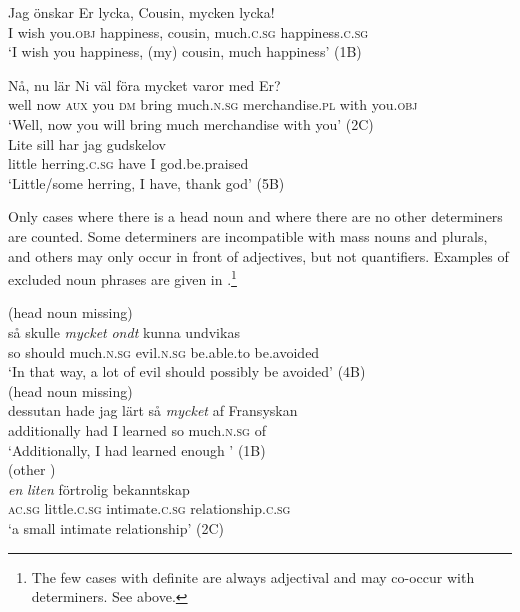 \documentclass[output=paper]{langscibook}
\begin{document}
\ea\label{ex:delsing:6}
\ea
\gll Jag  önskar    Er        lycka,      Cousin,  mycken      lycka! \\
I          wish     you.\textsc{obj}   happiness,  cousin,    much.\textsc{c}.\textsc{sg}  happiness.\textsc{c}.\textsc{sg}\\
\glt ‘I wish you happiness, (my) cousin, much happiness’ (1B)

\ex
\gll Nå,    nu    lär    Ni        väl    föra    mycket      varor med      Er? \\
    well    now    \textsc{aux}  you      \textsc{dm}     bring  much.\textsc{n.sg}  merchandise.\textsc{pl} with     you.\textsc{obj}\\
\glt ‘Well, now you will bring much merchandise with you’ (2C)\\

\ex
\gll Lite    sill            har    jag    gudskelov \\
    little    herring.\textsc{c}.\textsc{sg}   have   I       god.be.praised\\
    \glt ‘Little/some herring, I have, thank god’ (5B)\\
\z
\z



Only cases where there is a head noun and where there are no other determiners are counted. Some determiners are incompatible with mass nouns and plurals, and others may only occur in front of adjectives, but not quantifiers. Examples of excluded noun phrases are given in .\footnote{The few cases with definite  are always adjectival and may co-occur with determiners. See  above.}


\ea\label{ex:delsing:7}
\ea(head noun missing)\\
\gll så    skulle  \textit{mycket}         \textit{ondt}          kunna     undvikas     \\
so        should  much.\textsc{n.sg}   {evil.\textsc{n.sg}}  be.able.to be.avoided \\
    \glt ‘In that way, a lot of evil should possibly be avoided’ (4B)\\
\ex(head noun missing)\\
\gll dessutan    hade  jag  lärt      så    \textit{mycket} af    Fransyskan\\
     additionally  had  I      learned    so    {much.\textsc{n.sg}}   of    \\
\glt ‘Additionally, I had learned enough ’ (1B)\\
\ex  (other )\\
\gll \textit{en}         \textit{liten}          förtrolig        bekanntskap\\
    \textsc{ac.sg}    little\textsc{.c.sg}  intimate\textsc{.c.sg}     relationship.\textsc{c.sg}\\
    \glt ‘a small intimate relationship’ (2C)\\
\z
\z
\end{document}
